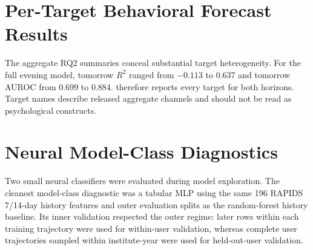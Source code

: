 \documentclass[a4paper,11pt,oneside]{report}
\begin{document}
\clearpage



\appendix

\chapter{Per-Target Behavioral Forecast Results}
\label{app:rq2-targets}

The aggregate RQ2 summaries conceal substantial target heterogeneity. For the full
evening model, tomorrow $R^2$ ranged from $-0.113$ to 0.637 and tomorrow AUROC from
0.699 to 0.884.  therefore reports every target for both
horizons. Target names describe released aggregate channels and should not be read
as psychological constructs.



\chapter{Neural Model-Class Diagnostics}
\label{app:neural-diagnostics}

Two small neural classifiers were evaluated during model exploration. The cleanest
model-class diagnostic was a tabular MLP using the same 196 RAPIDS 7/14-day history
features and outer evaluation splits as the random-forest history baseline. Its
inner validation respected the outer regime: later rows within each training
trajectory were used for within-user validation, whereas complete user trajectories
sampled within institute-year were used for held-out-user validation.
\end{document}
